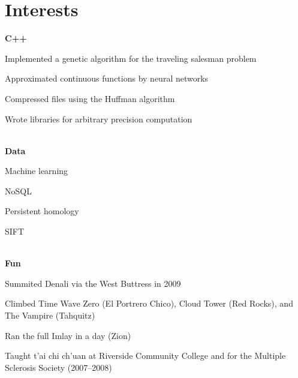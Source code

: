 \documentclass[11pt]{article}
\begin{document}
\section*{Interests}
\noindent\textbf{C++}
\begin{inparaitem}
\item Implemented a genetic algorithm for the traveling salesman problem
\item Approximated continuous functions by neural networks
\item Compressed files using the Huffman algorithm
\item Wrote libraries for arbitrary precision computation
\end{inparaitem}
\\
\noindent\textbf{Data}
\begin{inparaitem}
\item Machine learning
\item NoSQL
\item Persistent homology
\item SIFT
\end{inparaitem}
\\
\noindent\textbf{Fun}
\begin{inparaitem}
\item Summited Denali via the West Buttress in 2009
\item Climbed Time Wave Zero (El Portrero Chico), Cloud Tower (Red Rocks), and The Vampire (Tahquitz)
\item Ran the full Imlay in a day (Zion)
\item Taught t'ai chi ch'uan at Riverside Community College and for the Multiple Sclerosis Society (2007--2008)
\end{inparaitem}
\end{document}

